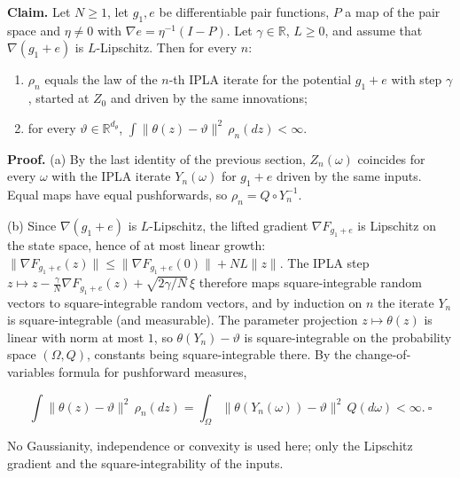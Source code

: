 \documentclass[11pt,a4paper]{article}
\begin{document}
\textbf{Claim.} Let \(N\ge1\), let \(g_1,e\) be differentiable pair functions, \(P\) a map of the pair space and \(\eta\ne0\) with \(\nabla e=\eta^{-1}(I-P)\). Let \(\gamma\in\mathbb R\), \(L\ge0\), and assume that \(\nabla(g_1+e)\) is \(L\)-Lipschitz. Then for every \(n\):



\begin{enumerate}


\item \(\rho_n\) equals the law of the \(n\)-th IPLA iterate for the potential \(g_1+e\) with step \(\gamma\), started at \(Z_0\) and driven by the same innovations;

\item for every \(\vartheta\in\mathbb R^{d_\theta}\), \(\int\|\theta(z)-\vartheta\|^2\,\rho_n(dz)<\infty\).

\end{enumerate}



\textbf{Proof.} (a) By the last identity of the previous section, \(Z_n(\omega)\) coincides for every \(\omega\) with the IPLA iterate \(Y_n(\omega)\) for \(g_1+e\) driven by the same inputs. Equal maps have equal pushforwards, so \(\rho_n=Q\circ Y_n^{-1}\).




(b) Since \(\nabla(g_1+e)\) is \(L\)-Lipschitz, the lifted gradient \(\nabla F_{g_1+e}\) is Lipschitz on the state space, hence of at most linear growth: \(\|\nabla F_{g_1+e}(z)\|\le\|\nabla F_{g_1+e}(0)\|+NL\|z\|\). The IPLA step \(z\mapsto z-\frac\gamma N\nabla F_{g_1+e}(z)+\sqrt{2\gamma/N}\,\xi\) therefore maps square-integrable random vectors to square-integrable random vectors, and by induction on \(n\) the iterate \(Y_n\) is square-integrable (and measurable). The parameter projection \(z\mapsto\theta(z)\) is linear with norm at most \(1\), so \(\theta(Y_n)-\vartheta\) is square-integrable on the probability space \((\Omega,Q)\), constants being square-integrable there. By the change-of-variables formula for pushforward measures,


\[\int\|\theta(z)-\vartheta\|^2\,\rho_n(dz)=\int_\Omega\|\theta(Y_n(\omega))-\vartheta\|^2\,Q(d\omega)<\infty .\ \square\]


No Gaussianity, independence or convexity is used here; only the Lipschitz gradient and the square-integrability of the inputs.
\end{document}

